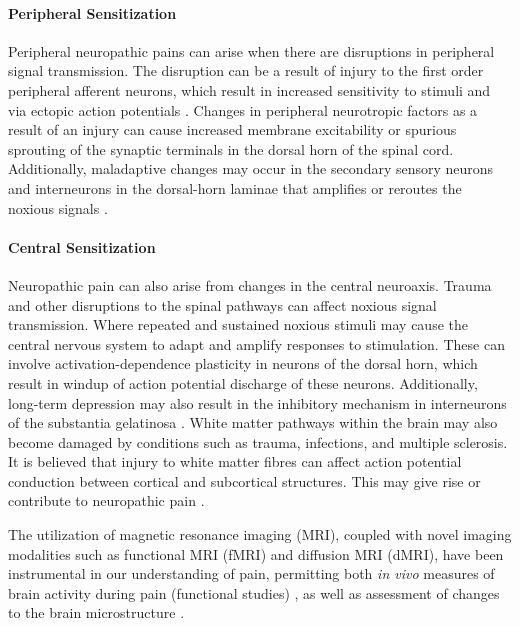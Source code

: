 \paragraph{Peripheral Sensitization}

Peripheral neuropathic pains can arise when there are disruptions in peripheral signal transmission. The disruption can be a result of injury to the first order peripheral afferent neurons, which result in increased sensitivity to stimuli and via ectopic action potentials \cite{Costigan2009}. Changes in peripheral neurotropic factors as a result of an injury can cause increased membrane excitability or spurious sprouting of the synaptic terminals in the dorsal horn of the spinal cord. Additionally, maladaptive changes may occur in the secondary sensory neurons and interneurons in the dorsal-horn laminae that amplifies or reroutes the noxious signals \cite{Elmes2004}.

\paragraph{Central Sensitization}

Neuropathic pain can also arise from changes in the central neuroaxis. Trauma and other disruptions to the spinal pathways can affect noxious signal transmission. Where repeated and sustained noxious stimuli may cause the central nervous system to adapt and amplify responses to stimulation. These can involve activation-dependence plasticity in neurons of the dorsal horn, which result in windup of action potential discharge of these neurons. Additionally, long-term depression may also result in the inhibitory mechanism in interneurons of the substantia gelatinosa \cite{Woolf2000}. White matter pathways within the brain may also become damaged by conditions such as trauma, infections, and multiple sclerosis. It is believed that injury to white matter fibres can affect action potential conduction between cortical and subcortical structures. This may give rise or contribute to neuropathic pain \cite{Geha2008}.

 The utilization of magnetic resonance imaging (MRI), coupled with novel imaging modalities such as functional MRI (fMRI) and diffusion MRI (dMRI), have been instrumental in our understanding of pain, permitting both \textit{in vivo} measures of brain activity during pain (functional studies) \cite{Davis2006}, as well as assessment of changes to the brain microstructure \cite{Hodaie2009a,Chen2015c}.
 

